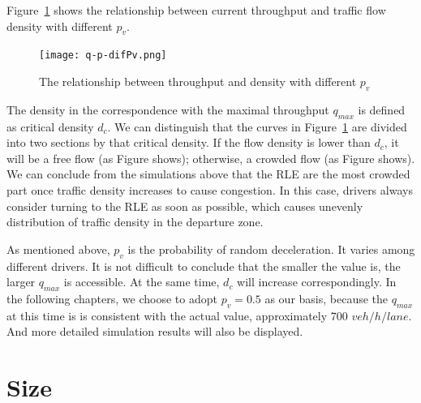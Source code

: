 \documentclass{mcmthesis}
\begin{document}
Figure~\ref{fig:q-p} shows the relationship between current throughput and
traffic flow density with different ${p}_{v}$.


\begin{figure}[h]
\small
\centering
\texttt{[image: q-p-difPv.png]}
\caption{The relationship between throughput and density with different ${p}_{v}$}
\label{fig:q-p}

\end{figure}

The density in the correspondence with the maximal throughput $q_{max}$ is
defined as critical density $d_{c}$. We can distinguish that the curves in
Figure~\ref{fig:q-p} are divided into two sections by that critical density.
If the flow density is lower than $d_{c}$, it will be a free flow (as Figure shows);%
 otherwise, a crowded flow (as Figure shows).%
We can conclude from the simulations above that the RLE are the most crowded
part once traffic density increases to cause congestion. In this case, drivers
always consider turning to the RLE as soon as possible, which causes unevenly
distribution of traffic density in the departure zone.


As mentioned above, ${p}_{v}$ is the probability of random deceleration.
It varies among different drivers. It is not difficult to conclude
that the smaller the value is, the larger $q_{max}$ is accessible. At the same
time, $d_{c}$ will increase correspondingly. In the following chapters, we
choose to adopt ${p}_{v}=0.5$ as our basis, because the $q_{max}$ at this time is
is consistent with the actual value, approximately 700 $veh/h/lane$. And more
detailed simulation results will also be displayed.

\section{Size}
\end{document}
